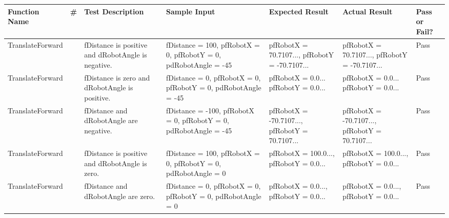 \documentclass[10pt, letterpaper]{article}
\begin{document}
\begin{table}[h]
    \centering
    \renewcommand{\arraystretch}{1.5}
    \begin{tabularx}{\textwidth}{
            |>{\raggedright\arraybackslash}p{3cm}
            |>{\raggedright\arraybackslash}p{0.20cm}
            |>{\raggedright\arraybackslash}p{2.5cm}
            |>{\raggedright\arraybackslash}X
            |>{\raggedright\arraybackslash}p{3cm}
            |>{\raggedright\arraybackslash}p{3cm}
            |>{\raggedright\arraybackslash}p{1cm}|
        }
        \hline

        \textbf{Function Name} &
        \textbf{\#} &
        \textbf{Test Description} &
        \textbf{Sample Input} &
        \textbf{Expected Result} &
        \textbf{Actual Result} &
        \textbf{Pass or Fail?} \\ 
        \hline


        TranslateForward &
        4 &
        fDistance is positive and dRobotAngle is negative. &
        fDistance = 100, pfRobotX = 0, pfRobotY = 0, pdRobotAngle = -45 &
        pfRobotX = 70.7107..., pfRobotY = -70.7107... &
        pfRobotX = 70.7107..., pfRobotY = -70.7107... &
        Pass \\
        \hline

        TranslateForward &
        5 &
        fDistance is zero and dRobotAngle is positive. &
        fDistance = 0, pfRobotX = 0, pfRobotY = 0, pdRobotAngle = -45 &
        pfRobotX = 0.0... pfRobotY = 0.0... &
        pfRobotX = 0.0... pfRobotY = 0.0... &
        Pass \\
        \hline

        TranslateForward &
        6 &
        fDistance and dRobotAngle are negative. &
        fDistance = -100, pfRobotX = 0, pfRobotY = 0, pdRobotAngle = -45 &
        pfRobotX = -70.7107..., pfRobotY = 70.7107... &
        pfRobotX = -70.7107..., pfRobotY = 70.7107... &
        Pass \\
        \hline

        TranslateForward &
        7 &
        fDistance is positive and dRobotAngle is zero. &
        fDistance = 100, pfRobotX = 0, pfRobotY = 0, pdRobotAngle = 0 &
        pfRobotX = 100.0..., pfRobotY = 0.0... &
        pfRobotX = 100.0..., pfRobotY = 0.0... &
        Pass \\
        \hline

        TranslateForward &
        8 &
        fDistance and dRobotAngle are zero. &
        fDistance = 0, pfRobotX = 0, pfRobotY = 0, pdRobotAngle = 0 &
        pfRobotX = 0.0..., pfRobotY = 0.0... &
        pfRobotX = 0.0..., pfRobotY = 0.0... &
        Pass \\
        \hline


\end{tabularx}
\end{table}
\end{document}
